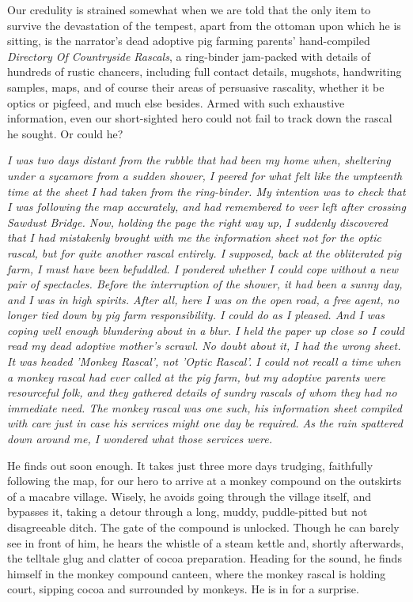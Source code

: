 Our credulity is strained somewhat when we are told that the only item to survive the devastation of the tempest, apart from the ottoman upon which he is sitting, is the narrator's dead adoptive pig farming parents' hand-compiled \emph{Directory Of Countryside Rascals}, a ring-binder jam-packed with details of hundreds of rustic chancers, including full contact details, mugshots, handwriting samples, maps, and of course their areas of persuasive rascality, whether it be optics or pigfeed, and much else besides. Armed with such exhaustive information, even our short-sighted hero could not fail to track down the rascal he sought. Or could he?

\emph{I was two days distant from the rubble that had been my home when, sheltering under a sycamore from a sudden shower, I peered for what felt like the umpteenth time at the sheet I had taken from the ring-binder. My intention was to check that I was following the map accurately, and had remembered to veer left after crossing Sawdust Bridge. Now, holding the page the right way up, I suddenly discovered that I had mistakenly brought with me the information sheet not for the optic rascal, but for quite another rascal entirely. I supposed, back at the obliterated pig farm, I must have been befuddled. I pondered whether I could cope without a new pair of spectacles. Before the interruption of the shower, it had been a sunny day, and I was in high spirits. After all, here I was on the open road, a free agent, no longer tied down by pig farm responsibility. I could do as I pleased. And I was coping well enough blundering about in a blur. I held the paper up close so I could read my dead adoptive mother's scrawl. No doubt about it, I had the wrong sheet. It was headed 'Monkey Rascal', not 'Optic Rascal'. I could not recall a time when a monkey rascal had ever called at the pig farm, but my adoptive parents were resourceful folk, and they gathered details of sundry rascals of whom they had no immediate need. The monkey rascal was one such, his information sheet compiled with care just in case his services might one day be required. As the rain spattered down around me, I wondered what those services were.}

He finds out soon enough. It takes just three more days trudging, faithfully following the map, for our hero to arrive at a monkey compound on the outskirts of a macabre village. Wisely, he avoids going through the village itself, and bypasses it, taking a detour through a long, muddy, puddle-pitted but not disagreeable ditch. The gate of the compound is unlocked. Though he can barely see in front of him, he hears the whistle of a steam kettle and, shortly afterwards, the telltale glug and clatter of cocoa preparation. Heading for the sound, he finds himself in the monkey compound canteen, where the monkey rascal is holding court, sipping cocoa and surrounded by monkeys. He is in for a surprise.

